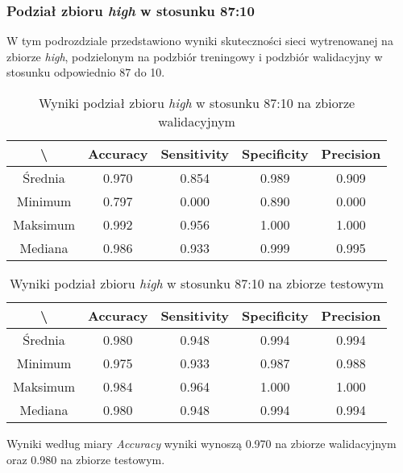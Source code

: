\subsubsection{Podział zbioru \textit{high} w stosunku 87:10}

W tym podrozdziale przedstawiono wyniki skuteczności sieci wytrenowanej na zbiorze \textit{high}, podzielonym na podzbiór treningowy i podzbiór walidacyjny w stosunku odpowiednio 87 do 10.

\begin{table}[H]
	\centering
	\caption{Wyniki podział zbioru \textit{high} w stosunku 87:10 na zbiorze walidacyjnym}
	\vspace{6pt}
	{\footnotesize
		\begin{tabular}{|c|c|c|c|c|}
      \hline \textbackslash & Accuracy & Sensitivity & Specificity & Precision \\
      \hline Średnia & 0.970 & 0.854 & 0.989 & 0.909 \\
      \hline Minimum & 0.797 & 0.000 & 0.890 & 0.000 \\
      \hline Maksimum & 0.992 & 0.956 & 1.000 & 1.000 \\
      \hline Mediana & 0.986 & 0.933 & 0.999 & 0.995 \\
      \hline
		\end{tabular}
	}
	\vspace{0pt}
\end{table}

\begin{table}[H]
	\centering
	\caption{Wyniki podział zbioru \textit{high} w stosunku 87:10 na zbiorze testowym}
	\vspace{6pt}
	{\footnotesize
		\begin{tabular}{|c|c|c|c|c|}
      \hline \textbackslash & Accuracy & Sensitivity & Specificity & Precision \\
      \hline Średnia & 0.980 & 0.948 & 0.994 & 0.994 \\
      \hline Minimum & 0.975 & 0.933 & 0.987 & 0.988 \\
      \hline Maksimum & 0.984 & 0.964 & 1.000 & 1.000 \\
      \hline Mediana & 0.980 & 0.948 & 0.994 & 0.994 \\
      \hline
		\end{tabular}
	}
	\vspace{0pt}
\end{table}

Wyniki według miary \textit{Accuracy} wyniki wynoszą 0.970 na zbiorze walidacyjnym oraz 0.980 na zbiorze testowym.
